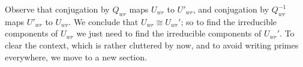 \documentclass[12pt,psamsfonts]{article}
\begin{document}
Observe that conjugation by \(Q_{wr}\) maps \(U_{wr}\) to \(U'_{wr}\), and conjugation by \(Q_{wr}^{-1}\) maps \(U'_{wr}\) to \(U_{wr}\).
We conclude that \(U_{wr} \cong U_{wr}'\); so to find the irreducible components of \(U_{wr}\) we just need to find the irreducible components of \(U_{wr}'\).
To clear the context, which is rather cluttered by now, and to avoid writing primes everywhere, we move to a new section.
\end{document}
